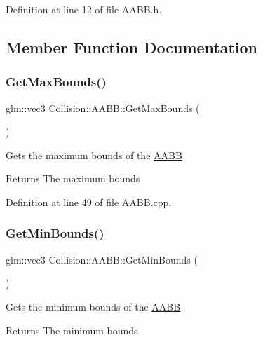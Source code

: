 Definition at line 12 of file A\+A\+B\+B.\+h.



\subsection{Member Function Documentation}
\mbox{\label{class_collision_1_1_a_a_b_b_a63411027d9f8b4300657afdeaa11f477}} 
\subsubsection{\texorpdfstring{Get\+Max\+Bounds()}{GetMaxBounds()}}
{\footnotesize\ttfamily glm\+::vec3 Collision\+::\+A\+A\+B\+B\+::\+Get\+Max\+Bounds (\begin{DoxyParamCaption}{ }\end{DoxyParamCaption})}

Gets the maximum bounds of the \hyperlink{class_collision_1_1_a_a_b_b}{A\+A\+BB} \begin{DoxyReturn}{Returns}
The maximum bounds 
\end{DoxyReturn}


Definition at line 49 of file A\+A\+B\+B.\+cpp.

\mbox{\label{class_collision_1_1_a_a_b_b_a4fb67a336a9dccc1e5df1742e5215a82}} 
\subsubsection{\texorpdfstring{Get\+Min\+Bounds()}{GetMinBounds()}}
{\footnotesize\ttfamily glm\+::vec3 Collision\+::\+A\+A\+B\+B\+::\+Get\+Min\+Bounds (\begin{DoxyParamCaption}{ }\end{DoxyParamCaption})}

Gets the minimum bounds of the \hyperlink{class_collision_1_1_a_a_b_b}{A\+A\+BB} \begin{DoxyReturn}{Returns}
The minimum bounds 
\end{DoxyReturn}


